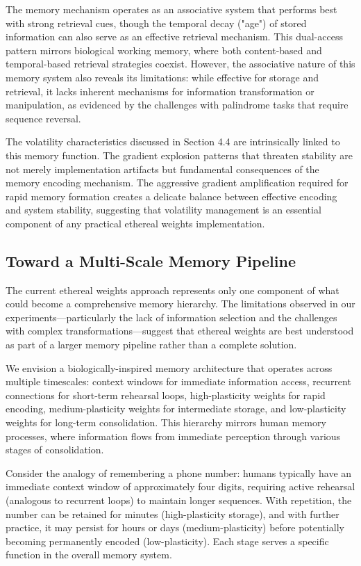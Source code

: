 \documentclass{article} %
\begin{document}
The memory mechanism operates as an associative system that performs best with strong retrieval cues, though the temporal decay ("age") of stored information can also serve as an effective retrieval mechanism. This dual-access pattern mirrors biological working memory, where both content-based and temporal-based retrieval strategies coexist. However, the associative nature of this memory system also reveals its limitations: while effective for storage and retrieval, it lacks inherent mechanisms for information transformation or manipulation, as evidenced by the challenges with palindrome tasks that require sequence reversal.

The volatility characteristics discussed in Section 4.4 are intrinsically linked to this memory function. The gradient explosion patterns that threaten stability are not merely implementation artifacts but fundamental consequences of the memory encoding mechanism. The aggressive gradient amplification required for rapid memory formation creates a delicate balance between effective encoding and system stability, suggesting that volatility management is an essential component of any practical ethereal weights implementation.

\subsection{Toward a Multi-Scale Memory Pipeline}

The current ethereal weights approach represents only one component of what could become a comprehensive memory hierarchy. The limitations observed in our experiments—particularly the lack of information selection and the challenges with complex transformations—suggest that ethereal weights are best understood as part of a larger memory pipeline rather than a complete solution.

We envision a biologically-inspired memory architecture that operates across multiple timescales: context windows for immediate information access, recurrent connections for short-term rehearsal loops, high-plasticity weights for rapid encoding, medium-plasticity weights for intermediate storage, and low-plasticity weights for long-term consolidation. This hierarchy mirrors human memory processes, where information flows from immediate perception through various stages of consolidation.

Consider the analogy of remembering a phone number: humans typically have an immediate context window of approximately four digits, requiring active rehearsal (analogous to recurrent loops) to maintain longer sequences. With repetition, the number can be retained for minutes (high-plasticity storage), and with further practice, it may persist for hours or days (medium-plasticity) before potentially becoming permanently encoded (low-plasticity). Each stage serves a specific function in the overall memory system.
\end{document}
